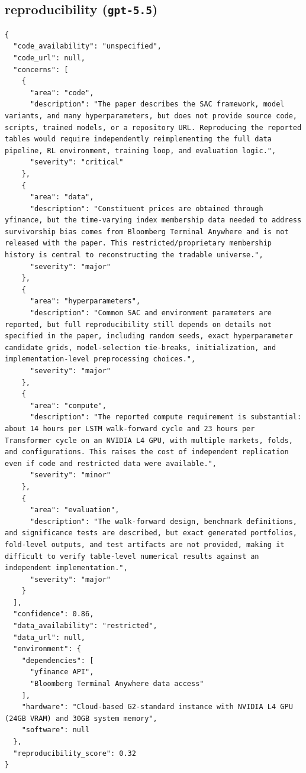 \documentclass[11pt]{article}
\begin{document}
\subsection*{reproducibility (\texttt{gpt-5.5})}
\begin{verbatim}
{
  "code_availability": "unspecified",
  "code_url": null,
  "concerns": [
    {
      "area": "code",
      "description": "The paper describes the SAC framework, model variants, and many hyperparameters, but does not provide source code, scripts, trained models, or a repository URL. Reproducing the reported tables would require independently reimplementing the full data pipeline, RL environment, training loop, and evaluation logic.",
      "severity": "critical"
    },
    {
      "area": "data",
      "description": "Constituent prices are obtained through yfinance, but the time-varying index membership data needed to address survivorship bias comes from Bloomberg Terminal Anywhere and is not released with the paper. This restricted/proprietary membership history is central to reconstructing the tradable universe.",
      "severity": "major"
    },
    {
      "area": "hyperparameters",
      "description": "Common SAC and environment parameters are reported, but full reproducibility still depends on details not specified in the paper, including random seeds, exact hyperparameter candidate grids, model-selection tie-breaks, initialization, and implementation-level preprocessing choices.",
      "severity": "major"
    },
    {
      "area": "compute",
      "description": "The reported compute requirement is substantial: about 14 hours per LSTM walk-forward cycle and 23 hours per Transformer cycle on an NVIDIA L4 GPU, with multiple markets, folds, and configurations. This raises the cost of independent replication even if code and restricted data were available.",
      "severity": "minor"
    },
    {
      "area": "evaluation",
      "description": "The walk-forward design, benchmark definitions, and significance tests are described, but exact generated portfolios, fold-level outputs, and test artifacts are not provided, making it difficult to verify table-level numerical results against an independent implementation.",
      "severity": "major"
    }
  ],
  "confidence": 0.86,
  "data_availability": "restricted",
  "data_url": null,
  "environment": {
    "dependencies": [
      "yfinance API",
      "Bloomberg Terminal Anywhere data access"
    ],
    "hardware": "Cloud-based G2-standard instance with NVIDIA L4 GPU (24GB VRAM) and 30GB system memory",
    "software": null
  },
  "reproducibility_score": 0.32
}
\end{verbatim}
\end{document}
